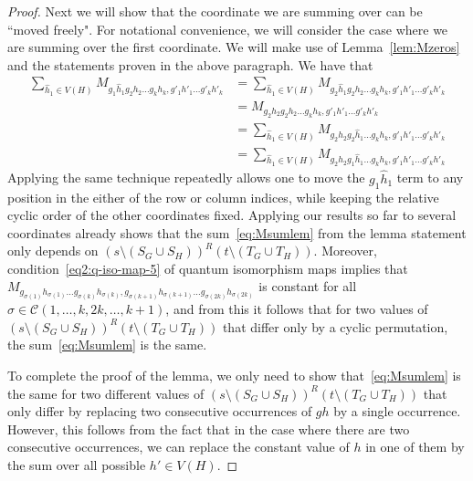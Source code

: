 \documentclass[a4paper,onecolumn,11pt,accepted=2026-01-06]{quantumarticle}
\theoremstyle{plain}
\theoremstyle{remark}
\theoremstyle{definition}
\DeclareMathOperator{\rel}{rel}
\newcommand{\cyclicpermutations}{\mathscr{C}(1,\dots, k, 2k, \dots, k+1)}
\begin{document}
\begin{proof}
Next we will show that the coordinate we are summing over can be ``moved freely". For notational convenience, we will consider the case where we are summing over the first coordinate. We will make use of Lemma~\ref{lem:Mzeros} and the statements proven in the above paragraph. We have that
\begin{align*}
    \sum_{\hat{h}_1 \in V(H)} M_{g_1\hat{h}_1g_2h_2\ldots g_kh_k,g'_1h'_1\ldots g'_kh'_k} &= \sum_{\hat{h}_1 \in V(H)} M_{g_2\hat{h}_1g_2h_2\ldots g_kh_k,g'_1h'_1\ldots g'_kh'_k} \\
    &= M_{g_2h_2g_2h_2\ldots g_kh_k,g'_1h'_1\ldots g'_kh'_k} \\
    &= \sum_{\hat{h}_1 \in V(H)} M_{g_2h_2g_2\hat{h}_1\ldots g_kh_k,g'_1h'_1\ldots g'_kh'_k} \\
    &= \sum_{\hat{h}_1 \in V(H)} M_{g_2h_2g_1\hat{h}_1\ldots g_kh_k,g'_1h'_1\ldots g'_kh'_k}
\end{align*}
Applying the same technique repeatedly allows one to move the $g_1\hat{h}_1$ term to any position in the either of the row or column indices, while keeping the relative cyclic order of the other coordinates fixed. Applying our results so far to several coordinates already shows that the sum~\eqref{eq:Msumlem} from the lemma statement only depends on $(s\setminus (S_G \cup S_H))^R(t\setminus (T_G \cup T_H))$. Moreover, condition~\eqref{eq2:q-iso-map-5} of quantum isomorphism maps implies that $M_{g_{\sigma(1)}h_{\sigma(1)}\dots g_{\sigma(k)}h_{\sigma(k)}, g_{\sigma(k+1)}h_{\sigma(k+1)}\dots g_{\sigma(2k)}h_{\sigma(2k)}}$
is constant for all $\sigma \in \cyclicpermutations$, and from this it follows that for two values of $(s\setminus (S_G \cup S_H))^R(t\setminus (T_G \cup T_H))$ that differ only by a cyclic permutation, the sum~\eqref{eq:Msumlem} is the same.

To complete the proof of the lemma, we only need to show that~\eqref{eq:Msumlem} is the same for two different values of $(s\setminus (S_G \cup S_H))^R(t\setminus (T_G \cup T_H))$ that only differ by replacing two consecutive occurrences of $gh$ by a single occurrence. However, this follows from the fact that in the case where there are two consecutive occurrences, we can replace the constant value of $h$ in one of them by the sum over all possible $h' \in V(H)$.
\end{proof}
\end{document}
